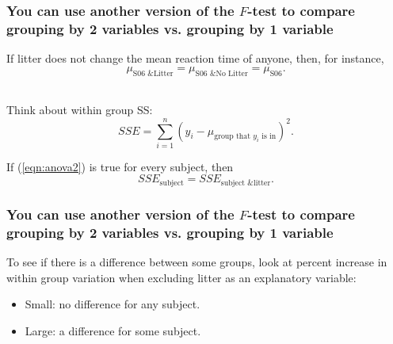 \documentclass[slidestop,compress,mathserif,12pt,t,professionalfonts,xcolor=table]{beamer}
\newcommand{\ftest}{You can use another version of the $F$-test to compare grouping by 2 variables vs. grouping by 1 variable}
\begin{document}
\begin{frame}
  \frametitle{\ftest}

If litter does not change the mean reaction time of anyone, then, for instance,
\begin{equation}
\label{eqn:anova2}
\mu_{\text{S06 \& Litter}} = \mu_{\text{S06 \& No Litter}} = \mu_{\text{S06}}.
\end{equation}

\pause

\hfill \\

Think about within group SS:
\[
SSE = \sum_{i=1}^n (y_i - \mu_{\text{group that $y_i$ is in}})^2.
\]

\pause

If (\ref{eqn:anova2}) is true for every subject, then
\[
SSE_{\text{subject}} = SSE_{\text{subject \& litter}}.
\]

\end{frame}


\begin{frame}
  \frametitle{\ftest}

{\small
To see if there is a difference between some groups, look at percent increase in within group variation when excluding litter as an explanatory variable:
}

\begin{itemize}
\item Small: no difference for any subject.
\item Large: a difference for some subject.
\end{itemize}

\hfill \\


\end{frame}

\end{document}
